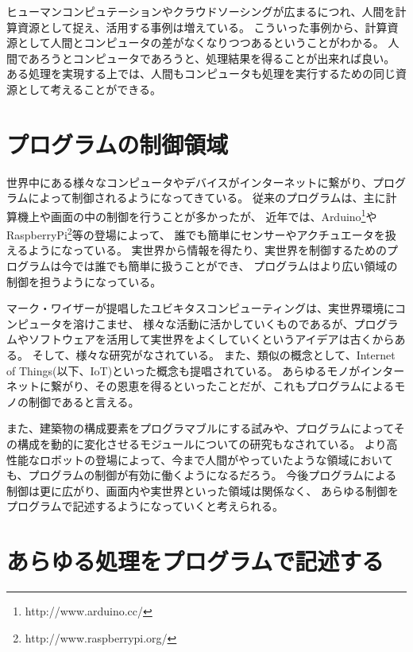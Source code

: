ヒューマンコンピュテーションやクラウドソーシングが広まるにつれ、人間を計算資源として捉え、活用する事例は増えている。
こういった事例から、計算資源として人間とコンピュータの差がなくなりつつあるということがわかる。
人間であろうとコンピュータであろうと、処理結果を得ることが出来れば良い。
ある処理を実現する上では、人間もコンピュータも処理を実行するための同じ資源として考えることができる。

\section{プログラムの制御領域}\label{ux30d7ux30edux30b0ux30e9ux30e0ux306eux5236ux5fa1ux9818ux57df}

世界中にある様々なコンピュータやデバイスがインターネットに繋がり、プログラムによって制御されるようになってきている。
従来のプログラムは、主に計算機上や画面の中の制御を行うことが多かったが、
近年では、Arduino\footnote{http://www.arduino.cc/}やRaspberryPi\footnote{http://www.raspberrypi.org/}等の登場によって、
誰でも簡単にセンサーやアクチュエータを扱えるようになっている。
実世界から情報を得たり、実世界を制御するためのプログラムは今では誰でも簡単に扱うことができ、
プログラムはより広い領域の制御を担うようになっている。

マーク・ワイザーが提唱したユビキタスコンピューティング\cite{weiser1991computer}は、実世界環境にコンピュータを溶けこませ、
様々な活動に活かしていくものであるが、プログラムやソフトウェアを活用して実世界をよくしていくというアイデアは古くからある。
そして、様々な研究がなされている。 また、類似の概念として、Internet of
Things(以下、IoT)\cite{iot}といった概念も提唱されている。
あらゆるモノがインターネットに繋がり、その恩恵を得るといったことだが、これもプログラムによるモノの制御であると言える。

また、建築物の構成要素をプログラマブルにする試み\cite{squama}や、プログラムによってその構成を動的に変化させるモジュールについての研究もなされている。
より高性能なロボットの登場によって、今まで人間がやっていたような領域においても、プログラムの制御が有効に働くようになるだろう。
今後プログラムによる制御は更に広がり、画面内や実世界といった領域は関係なく、
あらゆる制御をプログラムで記述するようになっていくと考えられる。

\section{あらゆる処理をプログラムで記述する}\label{ux3042ux3089ux3086ux308bux51e6ux7406ux3092ux30d7ux30edux30b0ux30e9ux30e0ux3067ux8a18ux8ff0ux3059ux308b}

